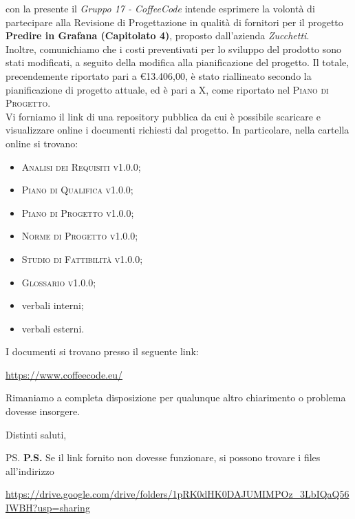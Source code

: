 \documentclass{letter}
\begin{document}
\begin{letter}{ }
con la presente il \textit{Gruppo 17 - CoffeeCode} intende esprimere la volontà di partecipare alla Revisione di Progettazione in qualità di fornitori per il progetto 
\textbf{Predire in Grafana (Capitolato 4)}, proposto dall'azienda \textit{Zucchetti}. \\
Inoltre, comunichiamo che i costi preventivati per lo sviluppo del prodotto sono stati modificati, a seguito della modifica alla pianificazione del progetto.
Il totale, precendemente riportato pari a \euro 13.406,00, è stato riallineato secondo la pianificazione di progetto attuale, ed è pari a X, come riportato nel \textsc{Piano di Progetto}. \\
Vi forniamo il link di una repository pubblica da cui è possibile scaricare e visualizzare online i documenti richiesti dal progetto. In particolare, nella cartella online si trovano:
\begin{itemize}
  \item \textsc{Analisi dei Requisiti v1.0.0};
  \item \textsc{Piano di Qualifica v1.0.0};
  \item \textsc{Piano di Progetto v1.0.0};
  \item \textsc{Norme di Progetto v1.0.0};
  \item \textsc{Studio di Fattibilità v1.0.0};
  \item \textsc{Glossario v1.0.0};
  \item verbali interni;
  \item verbali esterni.
\end{itemize}
\newpage
I documenti si trovano presso il seguente link:
\begin{center}
  \centering
  \href{https://www.coffeecode.eu/}{https://www.coffeecode.eu/}
\end{center}


Rimaniamo a completa disposizione per qualunque altro chiarimento o problema dovesse insorgere.

\closing{Distinti saluti,}

\ps
\textbf{P.S.} Se il link fornito non dovesse funzionare, si possono trovare i files all'indirizzo
\begin{center}
	\centering
	\href{https://drive.google.com/drive/folders/1pRK0dHK0DAJUMIMPOz_3LbIQaQ56IWBH?usp=sharing}{https://drive.google.com/drive/folders/1pRK0dHK0DAJUMIMPOz\_3LbIQaQ56IWBH?usp=sharing}
\end{center}

\end{letter}
\end{document}

